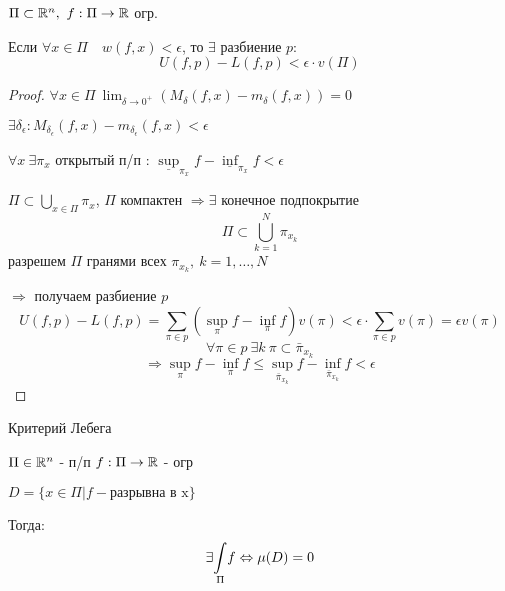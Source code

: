    \begin{lemma}
        $\Pi \subset \mathbb{R}^n, \ f : \Pi \rightarrow \mathbb{R}$ огр.
        \par Если $\forall x \in \Pi \quad w(f, x) < \epsilon$, то  $\exists$ разбиение $p$:
        \[
            U(f, p) - L(f, p) < \epsilon \cdot v(\Pi)    
        \]
    \end{lemma}
    \begin{proof}
        $\forall x \in \Pi \ \lim_{\delta \rightarrow 0^+}(M_\delta(f, x) - m_\delta(f, x)) = 0 $
        \par $\exists \delta_\epsilon : M_{\delta_\epsilon}(f, x) - m_{\delta_\epsilon}(f, x) < \epsilon$
        \par $\forall x \ \exists \pi_x$ открытый п/п : $\underline{\sup}_{\pi_x} f - \underline{\inf}_{\pi_x} f < \epsilon$
        \par $\Pi \subset \bigcup_{x \in \Pi} \pi_x$, $\Pi$ компактен $\Rightarrow \exists$ конечное подпокрытие
        \[
            \Pi \subset \bigcup_{k=1}^N \pi_{x_k}    
        \]
        разрешем $\Pi$ гранями всех $\pi_{x_k}, \ k = 1, \dots, N$
        \par $\Rightarrow$ получаем разбиение $p$
        \[
            U(f, p) - L(f, p) = \sum_{\pi \in p} (\sup_\pi f - \inf_\pi f) v(\pi) < \epsilon \cdot \sum_{\pi \in p} v(\pi) = \epsilon v(\pi)    
        \]
        \[
            \forall \pi \in p \ \exists k \ \pi \subset \bar \pi_{x_k}    
        \]
        \[
            \Rightarrow \sup_\pi f - \inf_\pi f \le \sup_{\bar \pi_{x_k}} f - \inf_{\bar \pi_{x_k}} f < \epsilon
        \]
    \end{proof}

    \begin{theorem}
        Критерий Лебега    

        \par $\Pi \in \mathbb{R}^n$ - п/п $f: \Pi \rightarrow \mathbb{R}$ - огр 
        \par $D = \{x \in \Pi | f - \text{разрывна в x}\}$
        \par Тогда:
        $$\exists \underset{\Pi}{\int} f \Leftrightarrow \mu(D)=0$$
    \end{theorem}

